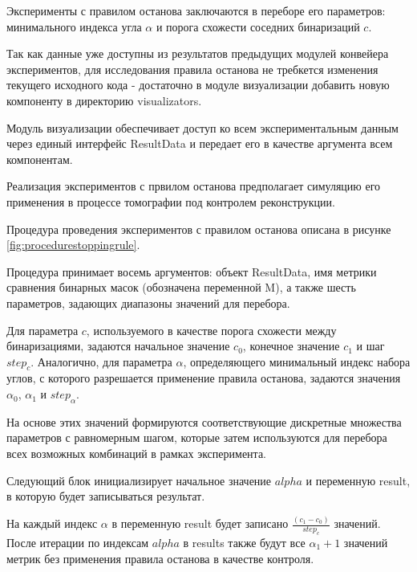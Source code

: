 Эксперименты с правилом останова заключаются в переборе его параметров: минимального индекса угла \(\alpha\) и порога схожести соседних бинаризаций \(c\).

Так как данные уже доступны из результатов предыдущих модулей конвейера экспериментов, для исследования правила останова не требкется изменения текущего исходного кода - достаточно в модуле визуализации добавить новую компоненту в директорию visualizators.

Модуль визуализации обеспечивает доступ ко всем экспериментальным данным через единый интерфейс ResultData и передает его в качестве аргумента всем компонентам.

Реализация экспериментов с првилом останова предполагает симуляцию его применения в процессе томографии под контролем реконструкции.

Процедура проведения экспериментов с правилом останова описана в рисунке \ref*{fig:procedurestoppingrule}.


Процедура принимает восемь аргументов: объект ResultData, 
имя метрики сравнения бинарных масок (обозначена переменной M), 
а также шесть параметров, задающих диапазоны значений для перебора.

Для параметра \(c\), используемого в качестве порога схожести между бинаризациями, задаются начальное значение \(c_0\), конечное значение \(c_1\) и шаг \(step_c\). Аналогично, для параметра \(\alpha\), определяющего минимальный индекс набора углов, с которого разрешается применение правила останова, задаются значения \(\alpha_0\), \(\alpha_1\) и \(step_{\alpha}\).

На основе этих значений формируются соответствующие дискретные множества параметров с равномерным шагом, которые затем используются для перебора всех возможных комбинаций в рамках эксперимента.

Следующий блок инициализирует начальное значение \(alpha\) и переменную result, в которую будет записываться результат. 

На каждый индекс \(\alpha\) в переменную result будет записано \(\frac{(c_1 - c_0)}{ step_c}\) значений. После итерации по индексам \(alpha\) в results также будут все \(\alpha_1 + 1\) значений метрик без применения правила останова в качестве контроля. 

